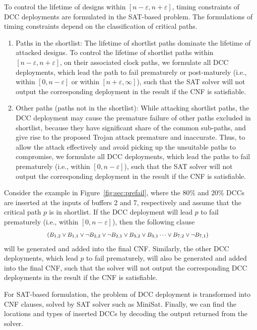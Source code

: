 To control the lifetime of designs within $[n - \varepsilon, n + \varepsilon]$, timing constraints of DCC deployments are formulated in the SAT-based problem. The formulations of timing constraints depend on the classification of critical paths.
\begin{enumerate}
	\item Paths in the shortlist: The lifetime of shortlist paths dominate the lifetime of attacked designs. To control the lifetime of shortlist paths within $[n - \varepsilon, n + \varepsilon]$, on their associated clock paths, we formulate all DCC deployments, which lead the path to fail prematurely or post-maturely (i.e., within $[ 0, n - \varepsilon]$ or within $[ n + \varepsilon, \infty]$), such that the SAT solver will not output the corresponding deployment in the result if the CNF is satisfiable.
	\item Other paths (paths not in the shortlist): While attacking shortlist paths, the DCC deployment may cause the premature failure of other paths excluded in shortlist, because they have significant share of the common sub-paths, and give rise to the proposed Trojan attack premature and inaccurate. Thus, to allow the attack effectively and avoid picking up the unsuitable paths to compromise, we formulate all DCC deployments, which lead the paths to fail prematurely (i.e., within $[ 0, n - \varepsilon]$), such that the SAT solver will not output the corresponding deployment in the result if the CNF is satisfiable.  
\end{enumerate}

Consider the example in Figure~\ref{fig:sec:prefail}, where the 80\% and 20\% DCCs are inserted at the inputs of buffers 2 and 7, respectively and assume that the critical path $p$ is in shortlist. If the DCC deployment will lead $p$ to fail prematurely (i.e., within $[ 0, n - \varepsilon]$), then the following clause
\begin{gather*}
	\fontsize{8}{8} \selectfont
	\mbox{($B_{1,2} \lor B_{1,1} \lor \neg B_{2,2} \lor \neg B_{2,1}  \lor B_{3,2} \lor B_{3,1} \dots \lor B_{7,2} \lor \neg B_{7,1}$) } 
\end{gather*}
will be generated and added into the final CNF. Similarly, the other DCC deployments, which lead $p$ to fail prematurely, will also be generated and added into the final CNF, such that the solver will not output the corresponding DCC deployments in the result if the CNF is satisfiable. 

For SAT-based formulation, the problem of DCC deployment is transformed into CNF clauses, solved by SAT solver such as MiniSat. Finally, we can find the locations and types of inserted DCCs by decoding the output returned from the solver.



